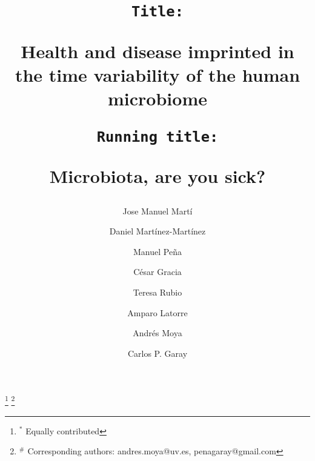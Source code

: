 \documentclass[12pt,oneside,letterpaper]{article}
\newcommand\importancename{Importance}
\newcommand{\importance}[1]{
	{
    \small
    \begin{center}
        {\bfseries \importancename\vspace{-.5em}\vspace{0pt}}
    \end{center}
    \begin{quote}
    #1
    \end{quote}
    }
}
\newcommand\wordcount{}
\begin{document}
\title{
	\vspace*{0mm} %
	\singlespacing
	\begin{flushleft}
		\texttt{\large Title:} \\
	\end{flushleft}
	\vspace*{2mm}
	Health and disease imprinted in the time variability of the human microbiome\\
	\vspace*{6mm}
	\begin{flushleft}
		\texttt{\large Running title:} \\
	\end{flushleft}
	\vspace*{0mm}
	Microbiota, are you sick?
	\vspace*{4mm}
	}

\doublespacing

\author[1,2,$*$]{Jose Manuel Martí}
\author[1,2,3,$*$]{Daniel Martínez-Martínez}
\author[2]{Manuel Peña}
\author[1,2]{César Gracia}
\author[1]{Teresa Rubio}
\author[1,3,4,5]{Amparo Latorre}
\author[1,3,4,5,\#]{Andrés Moya}
\author[1,2,\#]{Carlos P. Garay}


\date{}

\maketitle
\wordcount
\footnote[0]{$^*$ Equally contributed}
\footnote[0]{$^\#$ Corresponding authors: andres.moya@uv.es, penagaray@gmail.com}

\clearpage

\end{document}
